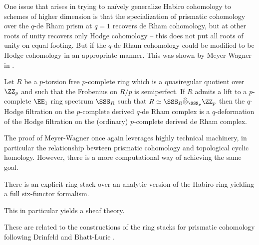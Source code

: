 One issue that arises in trying to na\"{i}vely generalize Habiro cohomology to schemes of higher dimension is that the specialization of prismatic cohomology over the $q$-de Rham prism at $q=1$ recovers de Rham cohomology, but at other roots of unity recovers only Hodge cohomology -- this does not put all roots of unity on equal footing. But if the $q$-de Rham cohomology could be modified to be Hodge cohomology in an appropriate manner. This was shown by Meyer-Wagner in \cite{MeyerWagner}. 
\begin{theorem}\label{thm: MeyerWagner main theorem}
    Let $R$ be a $p$-torsion free $p$-complete ring which is a quasiregular quotient over $\ZZ_{p}$ and such that the Frobenius on $R/p$ is semiperfect. If $R$ admits a lift to a $p$-complete $\EE_{1}$ ring spectrum $\SSS_{R}$ such that $R\simeq \SSS_{R}\widehat{\otimes}_{\SSS_{p}}\ZZ_{p}$ then the $q$-Hodge filtration on the $p$-complete derived $q$-de Rham complex is a $q$-deformation of the Hodge filtration on the (ordinary) $p$-complete derived de Rham complex. 
\end{theorem} 
The proof of Meyer-Wagner once again leverages highly technical machinery, in particular the relationship bewteen prismatic cohomology and topological cyclic homology. However, there is a more computational way of achieving the same goal.
\begin{theorem}[Scholze]\label{thm: analytic Habiro cohomology}
    There is an explicit ring stack over an analytic version of the Habiro ring yielding a full six-functor formalism.
\end{theorem}
\begin{remark}\label{rmk: get a sheaf theory}
    This in particular yields a sheaf theory.
\end{remark}
These are related to the constructions of the ring stacks for prismatic cohomology following Drinfeld \cite{DrinfeldPrismatization} and Bhatt-Lurie \cite{BhattLurieAbsolute}.